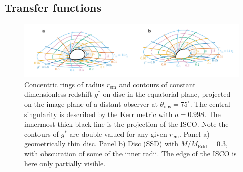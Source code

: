 \documentclass[fleqn,usenatbib]{mnras}
\newcommand{\rhoem}{r_\text{em}}
\begin{document}
\subsection{Transfer functions}
\label{sec:transfer-functions}

\begin{figure}
    \centering
    \includegraphics[width=0.95\linewidth]{figures/transfer-function.parameterization.pdf}
    \caption{Concentric rings of radius $\rhoem$ and contours of constant
    dimensionless redshift $g^\ast$ on disc in the equatorial plane, projected
on the image plane of a distant observer at $\theta_\text{obs} = 75^\circ$. The
central singularity is described by the Kerr metric with $a = 0.998$. The
innermost thick black line is the projection of the ISCO. Note the contours of
$g^\ast$ are double valued for any given $\rhoem$. Panel a) geometrically
thin disc. Panel b) \citet{shakura_black_1973} Disc (SSD) with $\dot{M} / \dot{M}_\text{Edd} = 0.3$, with
obscuration of some of the inner radii. The edge of the ISCO is here only
partially visible.}
    \label{fig:transfer-parameterisation}
\end{figure}
\end{document}
